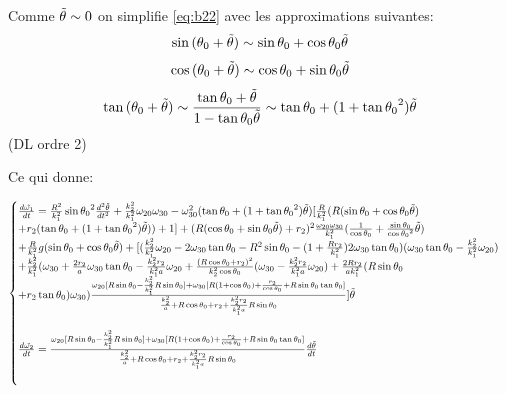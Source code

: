 Comme $\Tilde{\theta} \sim 0$ on simplifie \ref{eq:b22} avec les approximations suivantes:
$$
\sin{(\theta_0+\Tilde{\theta})} \sim \sin{\theta_0}+\cos{\theta_0}\Tilde{\theta} 
$$
$$
\cos{(\theta_0+\Tilde{\theta})} \sim \cos{\theta_0}+\sin{\theta_0}\Tilde{\theta} \\
$$
$$
\tan{(\theta_0+\Tilde{\theta})} \sim \frac{\tan{\theta_0}+\Tilde{\theta}}{1-\tan{\theta_0}\Tilde{\theta}} \sim \tan{\theta_0}+(1+\tan{\theta_0}^2)\Tilde{\theta} $$ (DL ordre 2)


Ce qui donne:

\begin{equation}
  \begin{cases}
    \frac{d\Tilde{\omega_1}}{dt}=\frac{R^2}{k_1^2}\sin{\theta_0}^2\frac{d^2\Tilde{\theta}}{dt^2}+\frac{k_2^2}{k_1^2}\omega_{20}\omega_{30}-\omega_{30}^2(\tan{\theta_0}+(1+\tan{\theta_0}^2)\Tilde{\theta})[\frac{R}{k_1^2}(R(\sin{\theta_0}+\cos{\theta_0}\Tilde{\theta} )\\
    
    +r_2(\tan{\theta_0}+(1+\tan{\theta_0}^2)\Tilde{\theta}))+1]
    +(R(\cos{\theta_0}+\sin{\theta_0}\Tilde{\theta})+r_2)^2\frac{\omega_{20}\omega_{30}}{k_1^2}(\frac{1}{\cos{\theta_0}}+\frac{\sin{\theta_0}}{\cos{\theta_0}^2}\Tilde{\theta})\\
    
    +\frac{R}{k_1^2}g (\sin{\theta_0}+\cos{\theta_0}\Tilde{\theta} )
    
    +[(\frac{k_2^2}{k_1^2}\omega_{20}-2\omega_{30}\tan{\theta_0}
    
    -R^2\sin{\theta_0}-(1+\frac{R r_2}{k_1^2})2\omega_{30}\tan{\theta_0})(\omega_{30}\tan{\theta_0}-\frac{k_2^2}{k_1^2}\omega_{20})\\
    
    +\frac{k_2^2}{k_1^2}(\omega_{30}+\frac{2r_2}{a}\omega_{30} \tan{\theta_0}-\frac{k_2^2 r_2}{k_1^2 a}\omega_{20}+\frac{(R\cos{\theta_0}+r_2)^2}{k_2^2\cos{\theta_0}}(\omega_{30}-\frac{k_2^2 r_2}{k_1^2 a}\omega_{20})+\frac{2R r_2}{a k_1^2}(R\sin{\theta_0}\\
    
    +r_2 \tan{\theta_0})\omega_{30})\frac{\omega_{20}[R\sin{\theta_0}-\frac{k_2^2}{k_1^2}R\sin{\theta_0}]+\omega_{30}[R(1+\cos{\theta_0})+\frac{r_2}{\cos{\theta_0}}+R\sin{\theta_0}\tan{\theta_0}]}{\frac{k_2^2}{a}+R\cos{\theta_0}+r_2+\frac{k_2^2 r_2}{k_1^2 a}R\sin{\theta_0}}]\Tilde{\theta} \\
    \\
    
    \frac{d\Tilde{\omega_2}}{dt}=\frac{\omega_{20}[R\sin{\theta_0}-\frac{k_2^2}{k_1^2}R\sin{\theta_0}]+\omega_{30}[R(1+\cos{\theta_0})+\frac{r_2}{\cos{\theta_0}}+R\sin{\theta_0}\tan{\theta_0}]}{\frac{k_2^2}{a}+R\cos{\theta_0}+r_2+\frac{k_2^2 r_2}{k_1^2 a}R\sin{\theta_0}} \frac{d\Tilde{\theta}}{dt}\\
    \\
    

\end{cases}
\end{equation}

